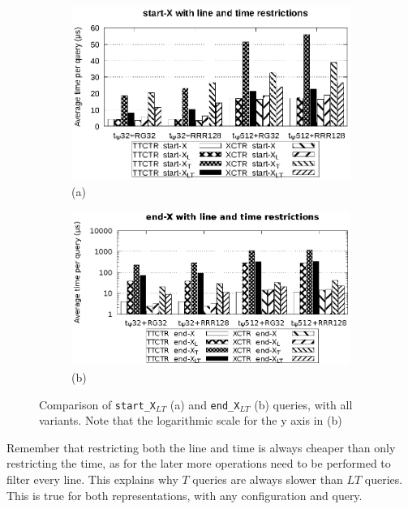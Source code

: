 \documentclass[runningheads]{llncs}
\begin{document}
\begin{figure}[hbt!]
\begin{subfigure}{0.5\linewidth}
\includegraphics[width=\linewidth]{experiments/start.eps}
\vspace{-12pt}
\caption{\footnotesize (a)}
\vspace{-12pt}
\end{subfigure}%
\begin{subfigure}{0.5\linewidth}
\includegraphics[width=\linewidth]{experiments/end.eps}
\vspace{-12pt}
\caption{\footnotesize (b)}
\vspace{-12pt}
\end{subfigure}
\caption{Comparison of \texttt{start\_X$_{LT}$} (a) and \texttt{end\_X$_{LT}$} (b) queries, with all variants. Note that the logarithmic scale for the y axis in (b)}
\label{fig:start}
\end{figure}

Remember that restricting both the line and time is always cheaper than only restricting the time, as for the later more operations need to be performed to filter every line. This explains why $T$ queries are always slower than $LT$ queries. This is true for both representations, with any configuration and query.
\end{document}
